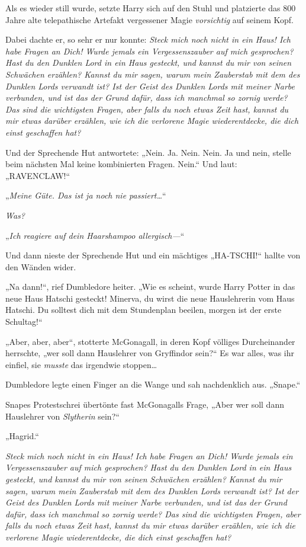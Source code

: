 Als es wieder still wurde, setzte Harry sich auf den Stuhl und platzierte das 800 Jahre alte telepathische Artefakt vergessener Magie \emph{vorsichtig} auf seinem Kopf.

Dabei dachte er, so sehr er nur konnte: \emph{Steck mich noch nicht in ein Haus! Ich habe Fragen an Dich! Wurde jemals ein Vergessenszauber auf mich gesprochen? Hast du den Dunklen Lord in ein Haus gesteckt, und kannst du mir von seinen Schwächen erzählen? Kannst du mir sagen, warum mein Zauberstab mit dem des Dunklen Lords verwandt ist? Ist der Geist des Dunklen Lords mit meiner Narbe verbunden, und ist das der Grund dafür, dass ich manchmal so zornig werde? Das sind die wichtigsten Fragen, aber falls du noch etwas Zeit hast, kannst du mir etwas darüber erzählen, wie ich die verlorene Magie wiederentdecke, die dich einst geschaffen hat?}

Und der Sprechende Hut antwortete: „Nein. Ja. Nein. Nein. Ja und nein, stelle beim nächsten Mal keine kombinierten Fragen. Nein.“ Und laut: „RAVENCLAW!“

\later

„\emph{Meine Güte. Das ist ja noch nie passiert…}“

\emph{Was?}

„\emph{Ich reagiere auf dein Haarshampoo allergisch—}“

Und dann nieste der Sprechende Hut und ein mächtiges „HA-TSCHI!“ hallte von den Wänden wider.

„Na dann!“, rief Dumbledore heiter. „Wie es scheint, wurde Harry Potter in das neue Haus Hatschi gesteckt! Minerva, du wirst die neue Hauslehrerin vom Haus Hatschi. Du solltest dich mit dem Stundenplan beeilen, morgen ist der erste Schultag!“

„Aber, aber, aber“, stotterte McGonagall, in deren Kopf völliges Durcheinander herrschte, „wer soll dann Hauslehrer von Gryffindor sein?“ Es war alles, was ihr einfiel, sie \emph{musste} das irgendwie stoppen…

Dumbledore legte einen Finger an die Wange und sah nachdenklich aus. „Snape.“

Snapes Protestschrei übertönte fast McGonagalls Frage, „Aber wer soll dann Hauslehrer von \emph{Slytherin} sein?“

„Hagrid.“

\later

\emph{Steck mich noch nicht in ein Haus! Ich habe Fragen an Dich! Wurde jemals ein Vergessenszauber auf mich gesprochen? Hast du den Dunklen Lord in ein Haus gesteckt, und kannst du mir von seinen Schwächen erzählen? Kannst du mir sagen, warum mein Zauberstab mit dem des Dunklen Lords verwandt ist? Ist der Geist des Dunklen Lords mit meiner Narbe verbunden, und ist das der Grund dafür, dass ich manchmal so zornig werde? Das sind die wichtigsten Fragen, aber falls du noch etwas Zeit hast, kannst du mir etwas darüber erzählen, wie ich die verlorene Magie wiederentdecke, die dich einst geschaffen hat?}

